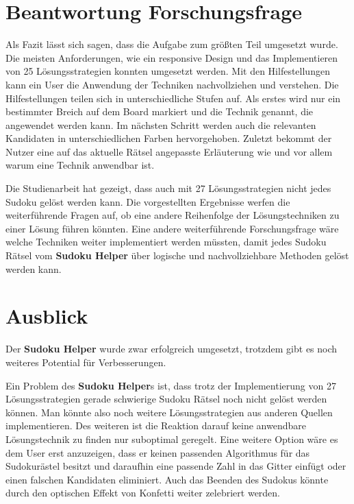 \section{Beantwortung Forschungsfrage}

Als Fazit lässt sich sagen, dass die Aufgabe zum größten Teil umgesetzt wurde. Die meisten Anforderungen, wie ein responsive Design und das Implementieren von 25 Lösungsstrategien konnten umgesetzt werden. Mit den Hilfestellungen kann ein User die Anwendung der Techniken nachvollziehen und verstehen. Die Hilfestellungen teilen sich in unterschiedliche Stufen auf. Als erstes wird nur ein bestimmter Breich auf dem Board markiert und die Technik genannt, die angewendet werden kann. Im nächsten Schritt werden auch die relevanten Kandidaten in unterschiedlichen Farben hervorgehoben. Zuletzt bekommt der Nutzer eine auf das aktuelle Rätsel angepasste Erläuterung wie und vor allem warum eine Technik anwendbar ist.

Die Studienarbeit hat gezeigt, dass auch mit 27 Lösungsstrategien nicht jedes Sudoku gelöst werden kann. Die vorgestellten Ergebnisse werfen die weiterführende Fragen auf, ob eine andere Reihenfolge der Lösungstechniken zu einer Lösung führen könnten. Eine andere weiterführende Forschungsfrage wäre welche Techniken weiter implementiert werden müssten, damit jedes Sudoku Rätsel vom \textbf{Sudoku Helper} über logische und nachvollziehbare Methoden gelöst werden kann.

\section{Ausblick}

Der \textbf{Sudoku Helper} wurde zwar erfolgreich umgesetzt, trotzdem gibt es noch weiteres Potential für Verbesserungen.

Ein Problem des \textbf{Sudoku Helper}s ist, dass trotz der Implementierung von 27 Lösungsstrategien gerade schwierige Sudoku Rätsel noch nicht gelöst werden können. Man könnte also noch weitere Lösungsstrategien aus anderen Quellen implementieren. Des weiteren ist die Reaktion darauf keine anwendbare Lösungstechnik zu finden nur suboptimal geregelt. Eine weitere Option wäre es dem User erst anzuzeigen, dass er keinen passenden Algorithmus für das Sudokurästel besitzt und daraufhin eine passende Zahl in das Gitter einfügt oder einen falschen Kandidaten eliminiert. Auch das Beenden des Sudokus könnte durch den optischen Effekt von Konfetti weiter zelebriert werden.


